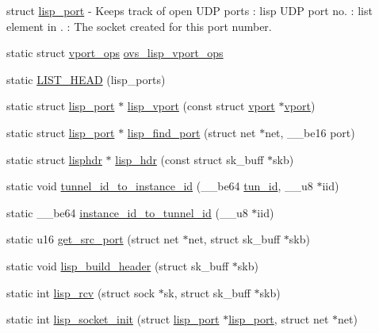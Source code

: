 struct \hyperlink{structlisp__port}{lisp\+\_\+port} -\/ Keeps track of open U\+D\+P ports \+: lisp U\+D\+P port no. \+: list element in . \+: The socket created for this port number. \begin{DoxyCompactItemize}
\item 
static struct \hyperlink{structvport__ops}{vport\+\_\+ops} \hyperlink{vport-lisp_8c_a758306cfbd9fe092cc094dbf165e5cf7}{ovs\+\_\+lisp\+\_\+vport\+\_\+ops}
\item 
static \hyperlink{vport-lisp_8c_a73d3f5ee301d4ee3135ff6fdecaebbe5}{L\+I\+S\+T\+\_\+\+H\+E\+A\+D} (lisp\+\_\+ports)
\item 
static struct \hyperlink{structlisp__port}{lisp\+\_\+port} $\ast$ \hyperlink{vport-lisp_8c_af8f69fb0b9db12e9a324a9932011b302}{lisp\+\_\+vport} (const struct \hyperlink{structvport}{vport} $\ast$\hyperlink{structvport}{vport})
\item 
static struct \hyperlink{structlisp__port}{lisp\+\_\+port} $\ast$ \hyperlink{vport-lisp_8c_ac170aebcefa72b3bccd6431da43de59d}{lisp\+\_\+find\+\_\+port} (struct net $\ast$net, \+\_\+\+\_\+be16 port)
\item 
static struct \hyperlink{structlisphdr}{lisphdr} $\ast$ \hyperlink{vport-lisp_8c_ac717e897cb8473e6d34982cbfc5aeaaa}{lisp\+\_\+hdr} (const struct sk\+\_\+buff $\ast$skb)
\item 
static void \hyperlink{vport-lisp_8c_aa7e66c2b840ffa52ae39f24fc21c0eb5}{tunnel\+\_\+id\+\_\+to\+\_\+instance\+\_\+id} (\+\_\+\+\_\+be64 \hyperlink{flow_8h_aba5027d7a3d96f0f58dd8e607365934b}{tun\+\_\+id}, \+\_\+\+\_\+u8 $\ast$iid)
\item 
static \+\_\+\+\_\+be64 \hyperlink{vport-lisp_8c_af20b35bc9be7a0b1273028a96b99d06b}{instance\+\_\+id\+\_\+to\+\_\+tunnel\+\_\+id} (\+\_\+\+\_\+u8 $\ast$iid)
\item 
static u16 \hyperlink{vport-lisp_8c_a106a25589649bc37c3905cb00fb59f62}{get\+\_\+src\+\_\+port} (struct net $\ast$net, struct sk\+\_\+buff $\ast$skb)
\item 
static void \hyperlink{vport-lisp_8c_afacb726760b72b4d01c27f470d4b7a3a}{lisp\+\_\+build\+\_\+header} (struct sk\+\_\+buff $\ast$skb)
\item 
static int \hyperlink{vport-lisp_8c_afad2c3b20aa9688a25d14456469ed17d}{lisp\+\_\+rcv} (struct sock $\ast$sk, struct sk\+\_\+buff $\ast$skb)
\item 
static int \hyperlink{vport-lisp_8c_a91b2b04c344bf1a50d02d4084fabf482}{lisp\+\_\+socket\+\_\+init} (struct \hyperlink{structlisp__port}{lisp\+\_\+port} $\ast$\hyperlink{structlisp__port}{lisp\+\_\+port}, struct net $\ast$net)

\end{DoxyCompactItemize}
